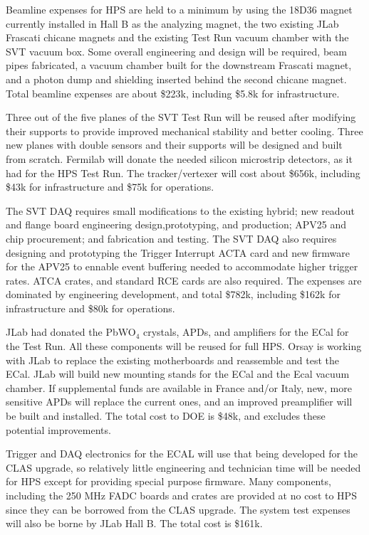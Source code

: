Beamline expenses for HPS are held to a minimum by using the 18D36 magnet currently installed in Hall B as the analyzing magnet, the 
two existing JLab Frascati chicane magnets and the existing Test Run vacuum chamber with the SVT vacuum box.  Some overall engineering and design will be 
required, beam pipes fabricated, a vacuum chamber built for the downstream 
Frascati magnet, and a photon dump and shielding inserted behind the second chicane magnet. Total beamline expenses are about \$223k, including \$5.8k for infrastructure.

Three out of the five planes of the SVT Test Run will be reused after modifying their supports to provide improved 
mechanical stability and better cooling. Three new planes with double sensors and their supports will be designed and built from 
scratch. Fermilab will donate the needed silicon microstrip detectors, as it had for the HPS Test Run. The tracker/vertexer  will cost about \$656k, including \$43k for 
infrastructure and \$75k for operations.

The SVT DAQ requires small modifications to the  existing hybrid; new readout and flange board engineering design,prototyping, and 
production; 
APV25 and chip procurement; and  fabrication and testing. The SVT DAQ also requires designing and prototyping the Trigger Interrupt 
ACTA card and new firmware for the APV25 to ennable event buffering needed to accommodate higher trigger rates. ATCA crates, and standard 
RCE cards are also required. The expenses are dominated by engineering development, and total \$782k, including \$162k for infrastructure and \$80k for operations.  

JLab had donated the PbWO$_4$ crystals, APDs, and amplifiers for the ECal for the Test Run. All these components will be reused for full HPS. 
Orsay is working with JLab to replace the existing motherboards and reassemble and test the ECal. JLab will build new mounting stands for 
the ECal and the Ecal vacuum chamber. If supplemental funds are available in France and/or Italy, new, more sensitive APDs will replace 
the current ones, and an improved preamplifier will be built and installed. The total cost to DOE is \$48k, and excludes these potential improvements. 

Trigger and DAQ electronics for the ECAL will use that being developed for 
the CLAS upgrade, so relatively little engineering and technician time will be needed for HPS except 
for providing special purpose firmware. Many components, including the 250 MHz FADC boards and crates are provided at no cost to HPS  
since they can be borrowed from the CLAS upgrade. The system test expenses will also be borne by JLab Hall B. The total cost 
is \$161k. 


